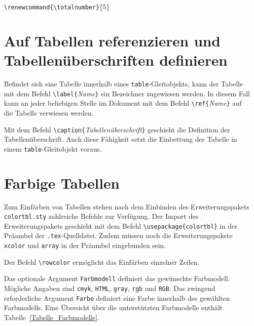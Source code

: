 \begin{boxedminipage}{\textwidth}
	\texttt{\textbackslash renewcommand\{\textbackslash totalnumber\}}\{5\} 
\end{boxedminipage}


\section{Auf Tabellen referenzieren und Tabellenüberschriften definieren}
\label{sec:tabellen_referenzieren}

Befindet sich eine Tabelle innerhalb eines \verb!table!-Gleitobjekts, kann der Tabelle mit dem Befehl \verb!\label{!\textsl{Name}\verb!}! ein Bezeichner zugewiesen werden. In diesem Fall kann an jeder beliebigen Stelle im Dokument mit dem Befehl \verb!\ref{!\textsl{Name}\verb!}! auf die Tabelle verwiesen werden.

Mit dem Befehl \verb!\caption{!\textsl{Tabellenüberschrift}\verb!}! geschieht die Definition der Tabellenüberschrift. Auch diese Fähigkeit setzt die Einbettung der Tabelle in einem \verb!table!-Gleitobjekt voraus. 

\section{Farbige Tabellen}

Zum Einfärben von Tabellen stehen nach dem Einbinden des Erweiterungspakets
\verb!colortbl.sty! zahlreiche Befehle zur Verfügung.  
Der Import des Erweiterungspakets geschieht mit dem Befehl 
\verb!\usepackage{colortbl}! in der Präambel der \verb!.tex!-Quelldatei. Zudem müssen noch die Erweiterungspakete \verb!xcolor! und \verb!array! in der Präambel eingebunden sein.

Der Befehl \verb!\rowcolor! 
ermöglicht das Einfärben einzelner Zeilen.


Das optionale Argument \verb!Farbmodell! definiert das gewünschte Farbmodell.
Mögliche Angaben sind \verb!cmyk!, \verb!HTML!, \verb!gray!, \verb!rgb! und \verb!RGB!.
Das zwingend erforderliche Argument \verb!Farbe! definiert eine Farbe innerhalb des gewählten Farbmodells. Eine Übersicht über die  unterstützten Farbmodelle enthält Tabelle~\ref{Tabelle_Farbmodelle}.


